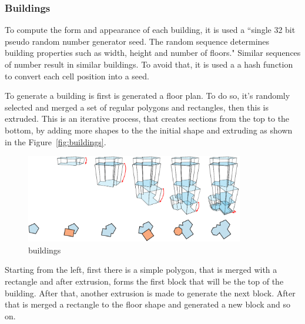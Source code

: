 
\subsubsection{Buildings} %
\label{ssub:buildings}


To compute the form and appearance of each building, it is used a ``single 32 bit pseudo random number generator seed. The random sequence determines building properties such as width, height and number of floors."
Similar sequences of number result in similar buildings. To avoid that, it is used a a hash function to convert each cell position into a seed.

To generate a building is first is generated a floor plan. To do so, it's randomly selected and merged a set of regular polygons and rectangles, then this is extruded. This is an iterative process, that creates sections from the top to the bottom, by adding more shapes to the the initial shape and extruding as shown in the Figure~\ref{fig:buildings}.

\begin{figure}[htbp]
	\centering
	\includegraphics[width=0.85\textwidth]{img/Real-Time-procedural-generation/Building-Generation.png}
	\caption{buildings}
	\label{fig:label}
\end{figure}


Starting from the left, first there is a simple polygon, that is merged with a rectangle and after extrusion, forms the first block that will be the top of the building. After that, another extrusion is made to generate the next block. After that is merged a rectangle to the floor shape and generated a new block and so on.

